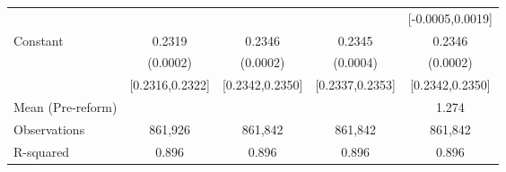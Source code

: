 {\begin{tabular}{l*{4}{c}}
                    &                     &                     &                     &[-0.0005,0.0019]         \\
Constant            &      0.2319\sym{***}&      0.2346\sym{***}&      0.2345\sym{***}&      0.2346\sym{***}\\
                    &    (0.0002)         &    (0.0002)         &    (0.0004)         &    (0.0002)         \\
                    &[0.2316,0.2322]         &[0.2342,0.2350]         &[0.2337,0.2353]         &[0.2342,0.2350]         \\
\midrule
Mean (Pre-reform)   &                     &                     &                     &       1.274         \\
Observations        &     861,926         &     861,842         &     861,842         &     861,842         \\
R-squared           &       0.896         &       0.896         &       0.896         &       0.896         \\
\bottomrule
\end{tabular}
}
